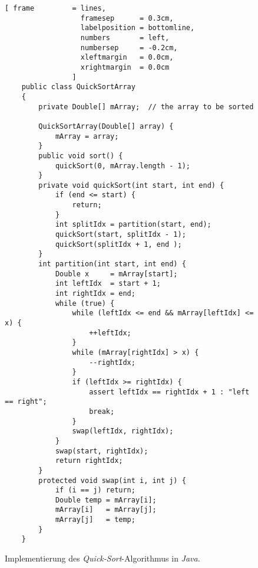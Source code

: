 \begin{figure}[!ht]
  \centering
\begin{Verbatim}[ frame         = lines, 
                  framesep      = 0.3cm, 
                  labelposition = bottomline,
                  numbers       = left,
                  numbersep     = -0.2cm,
                  xleftmargin   = 0.0cm,
                  xrightmargin  = 0.0cm
                ]
    public class QuickSortArray 
    {
        private Double[] mArray;  // the array to be sorted
    
        QuickSortArray(Double[] array) {
            mArray = array;
        }       
        public void sort() {
            quickSort(0, mArray.length - 1);
        }
        private void quickSort(int start, int end) {
            if (end <= start) {
                return;
            }
            int splitIdx = partition(start, end);
            quickSort(start, splitIdx - 1);  
            quickSort(splitIdx + 1, end );    
        }
        int partition(int start, int end) {
            Double x     = mArray[start];
            int leftIdx  = start + 1;
            int rightIdx = end;
            while (true) {
                while (leftIdx <= end && mArray[leftIdx] <= x) {
                    ++leftIdx;
                }
                while (mArray[rightIdx] > x) {
                    --rightIdx;
                }
                if (leftIdx >= rightIdx) {
                    assert leftIdx == rightIdx + 1 : "left == right";
                    break;
                }
                swap(leftIdx, rightIdx);
            }
            swap(start, rightIdx);
            return rightIdx;    
        }
        protected void swap(int i, int j) {
            if (i == j) return;
            Double temp = mArray[i];
            mArray[i]   = mArray[j];
            mArray[j]   = temp;
        }
    }
\end{Verbatim}
\vspace*{-0.3cm}
  \caption{Implementierung des \emph{Quick-Sort}-Algorithmus in \textsl{Java}.}
  \label{fig:QuickSort.java}
\end{figure}

